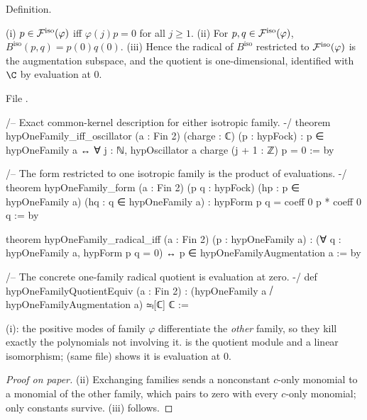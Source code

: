 \begin{status}
Definition.
\end{status}

\begin{theorem}\label{ch17:thm:onefamily}
(i) $p\in\mathcal{F}^{\mathrm{iso}}(\varphi)$ iff $\varphi(j)p=0$ for all $j\ge1$.  (ii) For $p,q\in\mathcal{F}^{\mathrm{iso}}(\varphi)$,
$B^{\mathrm{iso}}(p,q)=p(0)q(0)$.  (iii) Hence the radical of $B^{\mathrm{iso}}$ restricted to $\mathcal{F}^{\mathrm{iso}}(\varphi)$ is the augmentation
subspace, and the quotient is one-dimensional, identified with $\C$ by evaluation at $0$.
\end{theorem}

\noindent File .
\begin{leancode}
/-- Exact common-kernel description for either isotropic family. -/
theorem hypOneFamily_iff_oscillator (a : Fin 2) (charge : ℂ) (p : hypFock) :
    p ∈ hypOneFamily a ↔ ∀ j : ℕ, hypOscillator a charge (j + 1 : ℤ) p = 0 := by

/-- The form restricted to one isotropic family is the product of evaluations. -/
theorem hypOneFamily_form (a : Fin 2) (p q : hypFock)
    (hp : p ∈ hypOneFamily a) (hq : q ∈ hypOneFamily a) :
    hypForm p q = coeff 0 p * coeff 0 q := by

theorem hypOneFamily_radical_iff (a : Fin 2) (p : hypOneFamily a) :
    (∀ q : hypOneFamily a, hypForm p q = 0) ↔ p ∈ hypOneFamilyAugmentation a := by

/-- The concrete one-family radical quotient is evaluation at zero. -/
def hypOneFamilyQuotientEquiv (a : Fin 2) :
    (hypOneFamily a ⧸ hypOneFamilyAugmentation a) ≃ₗ[ℂ] ℂ :=
\end{leancode}

\begin{dictionary}
(i): the positive modes of family $\varphi$ differentiate the \emph{other} family, so they kill exactly the polynomials
not involving it.   is the quotient module and  a linear isomorphism;
 (same file) shows it is evaluation at $0$.
\end{dictionary}

\begin{proof}[Proof on paper]
(ii) Exchanging families sends a nonconstant $c$-only monomial to a monomial of the other family, which pairs to
zero with every $c$-only monomial; only constants survive.  (iii) follows.
\end{proof}

